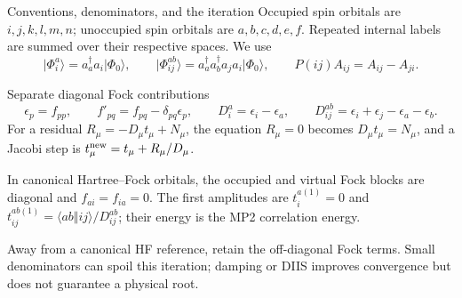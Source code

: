 \documentclass[aspectratio=169,10pt]{beamer}
\newcommand{\ket}[1]{\vert #1\rangle}
\newcommand{\cre}[1]{a_{#1}^{\dagger}}
\newcommand{\ann}[1]{a_{#1}}
\newcommand{\ph}{\Phi_0}
\newcommand{\as}[4]{\langle #1#2\Vert #3#4\rangle}
\begin{document}
\begin{frame}{Conventions, denominators, and the iteration}
\small
Occupied spin orbitals are $i,j,k,l,m,n$; unoccupied spin orbitals are $a,b,c,d,e,f$.
Repeated internal labels are summed over their respective spaces. We use
\[
 \ket{\Phi_i^a}=\cre a\ann i\ket{\ph},\qquad
 \ket{\Phi_{ij}^{ab}}=\cre a\cre b\ann j\ann i\ket{\ph},\qquad
 P(ij)A_{ij}=A_{ij}-A_{ji}.
\]
\begin{block}{Separate diagonal Fock contributions}
\[
 \epsilon_p=f_{pp},\qquad f'_{pq}=f_{pq}-\delta_{pq}\epsilon_p,\qquad
 D_i^a=\epsilon_i-\epsilon_a,\qquad
 D_{ij}^{ab}=\epsilon_i+\epsilon_j-\epsilon_a-\epsilon_b.
\]
For a residual $R_\mu=-D_\mu t_\mu+N_\mu$, the equation $R_\mu=0$ becomes
$D_\mu t_\mu=N_\mu$, and a Jacobi step is $t_\mu^{\rm new}=t_\mu+R_\mu/D_\mu$.
\end{block}
In canonical Hartree--Fock orbitals, the occupied and virtual Fock blocks are diagonal
and $f_{ai}=f_{ia}=0$. The first amplitudes are $t_i^{a(1)}=0$ and
$t_{ij}^{ab(1)}=\as abij/D_{ij}^{ab}$; their energy is the MP2 correlation energy.

\vspace{0.6em}
Away from a canonical HF reference, retain the off-diagonal Fock terms. Small
denominators can spoil this iteration; damping or DIIS improves convergence but
does not guarantee a physical root.
\end{frame}
\end{document}
